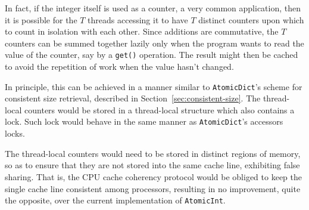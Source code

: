 In fact, if the integer itself is used as a counter, a very common application, then it is possible for the $T$ threads accessing it to have $T$ distinct counters upon which to count in isolation with each other.
Since additions are commutative, the $T$ counters can be summed together lazily only when the program wants to read the value of the counter, say by a \texttt{{get()}} operation.
The result might then be cached to avoid the repetition of work when the value hasn't changed.

In principle, this can be achieved in a manner similar to \texttt{AtomicDict}'s scheme for consistent size retrieval, described in Section~\ref{sec:consistent-size}.
The thread-local counters would be stored in a thread-local structure which also contains a lock.
Such lock would behave in the same manner as \texttt{AtomicDict}'s accessors locks.

The thread-local counters would need to be stored in distinct regions of memory, so as to ensure that they are not stored into the same cache line, exhibiting false sharing.
That is, the CPU cache coherency protocol would be obliged to keep the single cache line consistent among processors, resulting in no improvement, quite the opposite, over the current implementation of \texttt{AtomicInt}.

